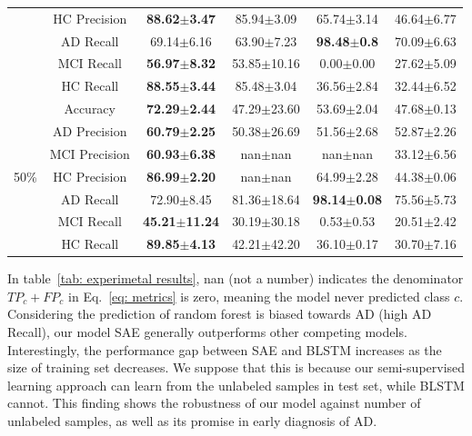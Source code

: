 \begin{table}
\begin{tabular}{c c cccc}
    & HC Precision & \multicolumn{1}{c}{{\bfseries 88.62$\pm$3.47}} & \multicolumn{1}{c}{85.94$\pm$3.09} & \multicolumn{1}{c}{65.74$\pm$3.14} & 46.64$\pm$6.77\\
    & AD Recall & \multicolumn{1}{c}{69.14$\pm$6.16} & \multicolumn{1}{c}{63.90$\pm$7.23} & \multicolumn{1}{c}{{\bfseries 98.48$\pm$0.8}} & 70.09$\pm$6.63\\
    & MCI Recall & \multicolumn{1}{c}{{\bfseries 56.97$\pm$8.32}} & \multicolumn{1}{c}{53.85$\pm$10.16} & \multicolumn{1}{c}{0.00$\pm$0.00} & 27.62$\pm$5.09\\
    & HC Recall & \multicolumn{1}{c}{{\bfseries 88.55$\pm$3.44}} & \multicolumn{1}{c}{85.48$\pm$3.04} & \multicolumn{1}{c}{36.56$\pm$2.84} & 32.44$\pm$6.52\\
    \midrule
    \multirow{7}{*}{50\%} %
    & Accuracy & \multicolumn{1}{c}{{\bfseries 72.29$\pm$2.44}} & \multicolumn{1}{c}{47.29$\pm$23.60} & \multicolumn{1}{c}{53.69$\pm$2.04} & 47.68$\pm$0.13\\
    & AD Precision & \multicolumn{1}{c}{{\bfseries 60.79$\pm$2.25}} & \multicolumn{1}{c}{50.38$\pm$26.69} & \multicolumn{1}{c}{51.56$\pm$2.68} & 52.87$\pm$2.26\\
    & MCI Precision & \multicolumn{1}{c}{{\bfseries 60.93$\pm$6.38}} & \multicolumn{1}{c}{nan$\pm$nan} & \multicolumn{1}{c}{nan$\pm$nan} & 33.12$\pm$6.56\\
    & HC Precision & \multicolumn{1}{c}{{\bfseries 86.99$\pm$2.20}} & \multicolumn{1}{c}{nan$\pm$nan} & \multicolumn{1}{c}{64.99$\pm$2.28} & 44.38$\pm$0.06\\
    & AD Recall & \multicolumn{1}{c}{72.90$\pm$8.45} & \multicolumn{1}{c}{81.36$\pm$18.64} & \multicolumn{1}{c}{{\bfseries 98.14$\pm$0.08}} & 75.56$\pm$5.73\\
    & MCI Recall & \multicolumn{1}{c}{{\bfseries 45.21$\pm$11.24}} & \multicolumn{1}{c}{30.19$\pm$30.18} & \multicolumn{1}{c}{0.53$\pm$0.53} & 20.51$\pm$2.42\\
    & HC Recall & \multicolumn{1}{c}{{\bfseries 89.85$\pm$4.13}} & \multicolumn{1}{c}{42.21$\pm$42.20} & \multicolumn{1}{c}{36.10$\pm$0.17} & 30.70$\pm$7.16\\
        \bottomrule
    \end{tabular}
\end{table}
In table~\ref{tab: experimetal results}, nan (not a number) indicates the denominator $TP_c + FP_c$ in Eq.~\eqref{eq: metrics} is zero, meaning the model never predicted class $c$. Considering the prediction of random forest is biased towards AD (high AD Recall), our model SAE generally outperforms other competing models. Interestingly, the performance gap between SAE and BLSTM increases as the size of training set decreases. We suppose that this is because our semi-supervised learning approach can learn from the unlabeled samples in test set, while BLSTM cannot. This finding shows the robustness of our model against number of unlabeled samples, as well as its promise in early diagnosis of AD.
